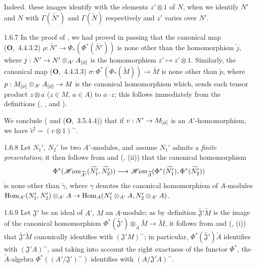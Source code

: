 Indeed. these images identify with the elements $z'\otimes 1$ of $N$, when we identify $N'$
and $N$ with $\Gamma(\widetilde{N'})$ and $\Gamma(\widetilde{N})$ respectively
 and $z'$ varies over $N'$.

\begin{env}{1.6.7}
\label{env-1.1.6.7}
In the proof of , we had proved in passing that the canonical map
(\textbf{O},~4.4.3.2) $\rho:\widetilde{N'}\to\Phi_*(\Phi^*(\widetilde{N'}))$ is none other
than the homomorphism $\widetilde{j}$,
where $j:N'\to N'\otimes_{A'}A_{[\phi]}$ is the homomorphism $z'\mapsto z'\otimes 1$.
Similarly, the canonical map (\textbf{O},~4.4.3.3)
$\sigma:\Phi^*(\Phi_*(\widetilde{M}))\to\widetilde{M}$ is none other than $\widetilde{p}$,
where $p:M_{[\phi]}\otimes_{A'}A_{[\phi]}\to M$ is the canonical homomorphism which, sends
each tensor product $z\otimes a$ ($z\in M$, $a\in A$) to $a\cdot z$; this follows immediately
from the definitions (, , and ).

We conclude ( and (\textbf{O},~3.5.4.4)) that if $v:N'\to M_{[\phi]}$ is an
$A'$-homomorphism, we have $\widetilde{v}^\sharp=(v\otimes 1)^\sim$.
\end{env}

\begin{env}{1.6.8}
\label{env-1.1.6.8}
Let $N_1'$, $N_2'$ be two $A'$-modules, and assume $N_1'$ admits a \emph{finite
presentation}; it then follows from  and (, (ii)) that the
canonical homomorphism 
\[
  \Phi^*(\mathscr{H}\!\textit{om}_{\widetilde{A'}}(\widetilde{N_1'},\widetilde{N_2'}))
  \longrightarrow\mathscr{H}\!\textit{om}_{\widetilde{A}}(\Phi^*(\widetilde{N_1'}),\Phi^*(\widetilde{N_2'}))
\]
is none other than $\widetilde{\gamma}$, where $\gamma$ denotes the canonical homomorphism
of $A$-modules
${\mathop{\mathrm{Hom}}\nolimits}_{A'}(N_1',N_2')\otimes_{A'}A\to{\mathop{\mathrm{Hom}}\nolimits}_A(N_1'\otimes_{A'}A,N_2'\otimes_{A'}A)$.
\end{env}

\begin{env}{1.6.9}
\label{env-1.1.6.9}
Let $\mathfrak{J}'$ be an ideal of $A'$, $M$ an $A$-module; as by definition
$\widetilde{\mathfrak{J}'}\widetilde{M}$ is the image of the canonical homomorphism
$\Phi^*(\widetilde{\mathfrak{J}'})\otimes_{\widetilde{A}}\widetilde{M}\to\widetilde{M}$, it
follows from  and (, (i)) that
$\widetilde{\mathfrak{J}'}\widetilde{M}$ canonically identifies with $(\mathfrak{J}'M)^\sim$;
in particular, $\Phi^*(\widetilde{\mathfrak{J}'})\widetilde{A}$ identifies with
$(\mathfrak{J}'A)^\sim$, and taking into account the right exactness of the functor $\Phi^*$,
the $\widetilde{A}$-algebra $\Phi^*((A'/\mathfrak{J}')^\sim)$ identifies with
$(A/\mathfrak{J}'A)^\sim$.
\end{env}

